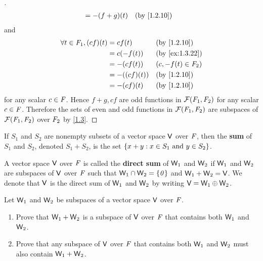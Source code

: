 \begin{proof}[]
\begin{align*}
		                               & = -(f + g)(t)    &  & \by{1.2.10}
	\end{align*}
	and
	\begin{align*}
		\forall t \in \F_1, (cf)(t) & = cf(t)      &  & \by{1.2.10}         \\
		                            & = c(-f(t))   &  & \by{ex:1.3.22}      \\
		                            & = -(cf(t))   &  & (c, -f(t) \in \F_2) \\
		                            & = -((cf)(t)) &  & \by{1.2.10}         \\
		                            & = -(cf)(t)   &  & \by{1.2.10}
	\end{align*}
	for any scalar \(c \in \mathit{F}\).
	Hence \(f + g, cf\) are odd functions in \(\mathcal{F}(\mathit{F}_1, \mathit{F}_2)\) for any scalar \(c \in \mathit{F}\).
	Therefore the sets of even and odd functions in \(\mathcal{F}(\mathit{F}_1, \mathit{F}_2)\) are subspaces of \(\mathcal{F}(\mathit{F}_1, \mathit{F}_2)\) over \(\mathit{F}_2\) by \cref{1.3}.
\end{proof}

\begin{defn}\label{1.3.10}
	If \(S_1\) and \(S_2\) are nonempty subsets of a vector space \(\mathsf{V}\) over \(\mathit{F}\), then the \textbf{sum} of \(S_1\) and \(S_2\), denoted \(S_1 + S_2\), is the set \(\left\lbrace x + y : x \in S_1 \text{ and } y \in S_2\right\rbrace\).
\end{defn}

\begin{defn}\label{1.3.11}
	A vector space \(\mathsf{V}\) over \(\mathit{F}\) is called the \textbf{direct sum} of \(\mathsf{W}_1\) and \(\mathsf{W}_2\) if \(\mathsf{W}_1\) and \(\mathsf{W}_2\) are subspaces of \(\mathsf{V}\) over \(\mathit{F}\) such that \(\mathsf{W}_1 \cap \mathsf{W}_2 = \left\lbrace\mathit{0}\right\rbrace\) and \(\mathsf{W}_1 + \mathsf{W}_2 = \mathsf{V}\).
	We denote that \(\mathsf{V}\) is the direct sum of \(\mathsf{W}_1\) and \(\mathsf{W}_2\) by writing \(\mathsf{V} = \mathsf{W}_1 \oplus \mathsf{W}_2\).
\end{defn}

\begin{ex}\label{ex:1.3.23}
	Let \(\mathsf{W}_1\) and \(\mathsf{W}_2\) be subspaces of a vector space \(\mathsf{V}\) over \(\mathit{F}\).
	\begin{enumerate}
		\item Prove that \(\mathsf{W}_1 + \mathsf{W}_2\) is a subspace of \(\mathsf{V}\) over \(\mathit{F}\) that contains both \(\mathsf{W}_1\) and \(\mathsf{W}_2\).
		\item Prove that any subspace of \(\mathsf{V}\) over \(\mathit{F}\) that contains both \(\mathsf{W}_1\) and \(\mathsf{W}_2\) must also contain \(\mathsf{W}_1 + \mathsf{W}_2\).
	\end{enumerate}
\end{ex}

